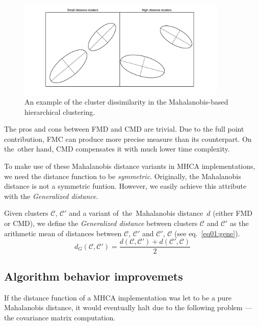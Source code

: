\begin{figure}\centering
	\includegraphics[width=10cm]{img/ellipses}
	\caption{An example of the cluster dissimilarity in the Mahalanobis-based hierarchical clustering.}
	\label{fig01:ellipses}
\end{figure}



The pros and cons between FMD and CMD are trivial. Due to the full point contribution, FMC can produce more precise measure than its counterpart. On the~other hand, CMD compensates it with much lower time complexity.

\vspace{0.5cm}

To make use of these Mahalanobis distance variants in MHCA implementations, we need the distance function to be \emph{symmetric}. Originally, the Mahalanobis distance is not a symmetric funtion. However, we easily achieve this attribute with the \emph{Generalized distance}.

\begin{defn}
	Given clusters $\mathcal{C}$, $\mathcal{C}'$ and a variant of~the~Mahalanobis distance~$d$ (either FMD or CMD), we define the \emph{Generalized distance} between clusters $\mathcal{C}$ and $\mathcal{C}'$ as the arithmetic mean of distances between $\mathcal{C}$, $\mathcal{C}'$ and $\mathcal{C}'$, $\mathcal{C}$ (see eq.~\ref{eq01:gene}).
	\begin{equation}\label{eq01:gene}
	d_G(\mathcal{C},\mathcal{C}') = \frac{d(\mathcal{C},\mathcal{C}')+d(\mathcal{C}',\mathcal{C})}{2}
	\end{equation}
	\label{def01:gene}
\end{defn}  


\subsection{Algorithm behavior improvemets}

If the distance function of a MHCA implementation was let to be a pure Mahalanobis distance, it would eventually halt due to the following problem --- the covariance matrix computation.


